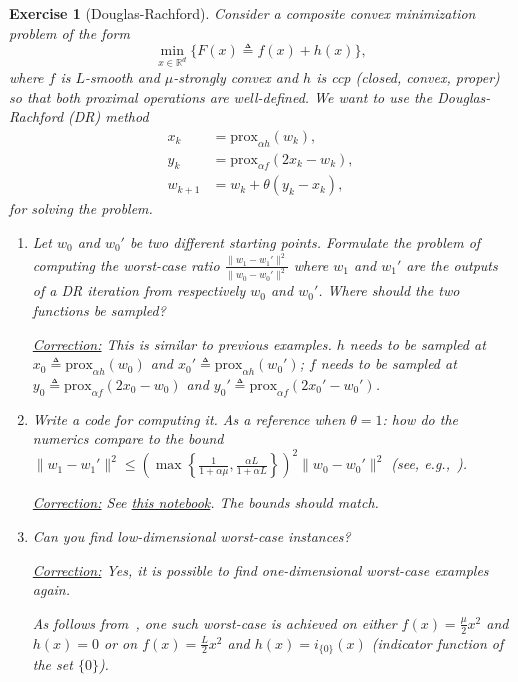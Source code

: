 \documentclass[11pt,a4paper]{article}
\newcommand{\correction}[1]{{{\color{blue}\underline{Correction:} #1}}}
\newcommand{\correction}[1]{}
\newtheorem{exercise}{Exercise}
\begin{document}
\begin{exercise}[Douglas-Rachford]\label{ex:drs} Consider a composite convex minimization problem of the form
	\[ \min_{x\in\mathbb{R}^d} \{F(x)\triangleq f(x)+h(x)\},\]
where $f$ is $L$-smooth and $\mu$-strongly convex and $h$ is ccp (closed, convex, proper) so that both proximal operations are well-defined. We want to use the Douglas-Rachford (DR) method
\begin{equation*}
\begin{aligned}
x_k & = \mathrm{prox}_{\alpha h}(w_k), \\
y_k & =  \mathrm{prox}_{\alpha f}(2x_k - w_k),\\
w_{k+1} & =  w_k + \theta (y_k - x_k),
\end{aligned}
\end{equation*}
for solving the problem.
	\begin{enumerate}
	\item Let $w_0$ and $w_0'$ be two different starting points. Formulate the problem of computing the worst-case ratio $\frac{\|w_1-w_1'\|^2}{\|w_0-w_0'\|^2}$ where $w_1$ and $w_1'$ are the outputs of a DR iteration from respectively $w_0$ and $w_0'$. Where should the two functions be sampled?
	
	\correction{This is similar to previous examples. $h$ needs to be sampled at $x_0\triangleq\mathrm{prox}_{\alpha h}(w_0)$ and $x_0'\triangleq\mathrm{prox}_{\alpha h}(w_0')$; $f$ needs to be sampled at $y_0\triangleq\mathrm{prox}_{\alpha f}(2x_0 - w_0)$ and $y_0'\triangleq\mathrm{prox}_{\alpha f}(2x_0' - w_0')$.}
	
	\item Write a code for computing it. As a reference when $\theta=1$: how do the numerics compare to the bound $\|w_1-w_1'\|^2\leqslant \left(\max\left\{\frac{1}{1+\alpha \mu},\frac{\alpha L}{1+\alpha L} \right\}\right)^2\|w_0-w_0'\|^2$ (see, e.g.,~\cite[Theorem 2]{giselsson2016linear}).
	
	\correction{See \href{https://github.com/PerformanceEstimation/Learning-Performance-Estimation/tree/main/Codes/Jupyter/Exercise10.ipynb}{this notebook}. The bounds should match.}
	
	\item Can you find low-dimensional worst-case instances?
	
	\correction{Yes, it is possible to find one-dimensional worst-case examples again.
	
	As follows from~\cite[Section 3.2]{giselsson2016linear}, one such worst-case is achieved on either $f(x)=\tfrac{\mu}{2}x^2$ and $h(x)=0$ or on $f(x)=\tfrac{L}{2}x^2$ and $h(x)=i_{\{0\}}(x)$ (indicator function of the set $\{0\}$).}
	\end{enumerate}
	\end{exercise}
\end{document}
